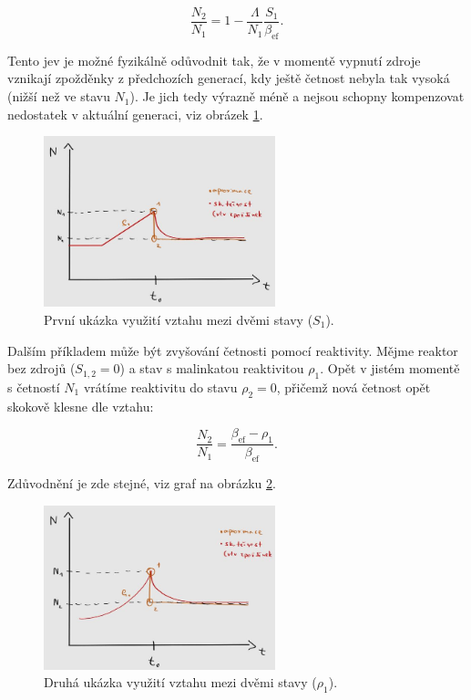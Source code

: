 $$ \dfrac{N_2}{N_1} = 1 - \dfrac{\Lambda}{N_1} \dfrac{S_1}{\beta_{\text{ef}}}. $$

Tento jev je možné fyzikálně odůvodnit tak, že v momentě vypnutí zdroje vznikají zpožděnky z předchozích generací, kdy ještě četnost nebyla tak vysoká (nižší než ve stavu $N_1$). Je jich tedy výrazně méně a nejsou schopny kompenzovat nedostatek v aktuální generaci, viz obrázek \ref{fig_podil_N_1}.

\begin{figure}[H]
 \centering
 \includegraphics[width=0.6\textwidth]{img/podil_N_1.jpg}
 \caption{První ukázka využití vztahu mezi dvěmi stavy ($S_1$).}
 \label{fig_podil_N_1}
\end{figure}

Dalším příkladem může být zvyšování četnosti pomocí reaktivity. Mějme reaktor bez zdrojů ($S_{1,2} = 0$) a stav s malinkatou reaktivitou $\rho_1$. Opět v jistém momentě s četností $N_1$ vrátíme reaktivitu do stavu $\rho_2 = 0$, přičemž nová četnost opět skokově klesne dle vztahu:

$$ \dfrac{N_2}{N_1} = \dfrac{\beta_{\text{ef}} - \rho_1}{\beta_{\text{ef}}}. $$

Zdůvodnění je zde stejné, viz graf na obrázku \ref{fig_podil_N_2}.

\begin{figure}[H]
 \centering
 \includegraphics[width=0.6\textwidth]{img/podil_N_2.jpg}
 \caption{Druhá ukázka využití vztahu mezi dvěmi stavy ($\rho_1$).}
 \label{fig_podil_N_2}
\end{figure}

